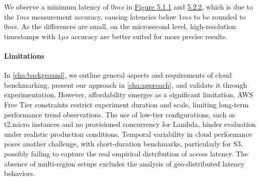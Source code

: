We observe a minimum latency of $0ms$ in \hyperref[fig:bar_rds_const]{Figure 5.1.1} and \hyperref[fig:bar_rds_bursty]{5.2.2}, which is due to the $1ms$ measurement accuracy, causing latencies below $1ms$ to be rounded to $0ms$. As the differences are small, on the microsecond level, high-resolution timestamps with $1\mu s$ accuracy are better suited for more precise results.

\paragraph*{Limitations} In \cref{cha:background}, we outline general aspects and requirements of cloud benchmarking, present our approach in \cref{cha:approach}, and validate it through experimentation. However, affordability emerges as a significant limitation. AWS Free Tier constraints restrict experiment duration and scale, limiting long-term performance trend observations. The use of low-tier configurations, such as t2.micro instances and no provisioned concurrency for Lambda, hinder evaluation under realistic production conditions. Temporal variability in cloud performance poses another challenge, with short-duration benchmarks, particularly for S3, possibly failing to capture the real empirical distribution of access latency. The absence of multi-region setups excludes the analysis of geo-distributed latency behaviors.
